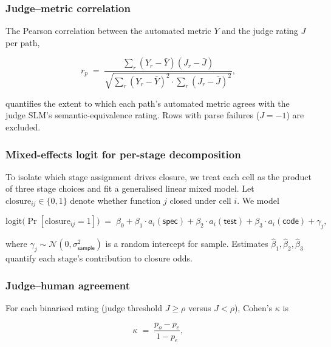 \subsubsection{Judge--metric correlation}

The Pearson correlation between the automated metric $Y$ and the judge rating $J$ per path,

\begin{equation}
  r_p \;=\; \frac{\textstyle\sum_{r} (Y_r - \bar{Y})(J_r - \bar{J})}{\sqrt{\textstyle\sum_r (Y_r - \bar{Y})^2 \cdot \textstyle\sum_r (J_r - \bar{J})^2}},
  \label{eq:corr}
\end{equation}

quantifies the extent to which each path's automated metric agrees with the judge SLM's semantic-equivalence rating. Rows with parse failures ($J = -1$) are excluded.

\subsubsection{Mixed-effects logit for per-stage decomposition}

To isolate which stage assignment drives closure, we treat each cell as the product of three stage choices and fit a generalised linear mixed model. Let $\text{closure}_{ij} \in \{0, 1\}$ denote whether function $j$ closed under cell $i$. We model

\begin{equation}
  \text{logit}\bigl(\Pr[\text{closure}_{ij} = 1]\bigr)
  \;=\;
  \beta_0
  + \beta_1 \cdot a_i(\textsf{spec})
  + \beta_2 \cdot a_i(\textsf{test})
  + \beta_3 \cdot a_i(\textsf{code})
  + \gamma_j,
  \label{eq:mixedlogit}
\end{equation}

where $\gamma_j \sim \mathcal{N}(0, \sigma_{\textsf{sample}}^2)$ is a random intercept for sample. Estimates $\hat{\beta}_1, \hat{\beta}_2, \hat{\beta}_3$ quantify each stage's contribution to closure odds.

\subsubsection{Judge--human agreement}

For each binarised rating (judge threshold $J \geq \rho$ versus $J < \rho$), Cohen's $\kappa$ is

\begin{equation}
  \kappa
  \;=\;
  \frac{p_o - p_e}{1 - p_e},
  \label{eq:kappa}
\end{equation}

